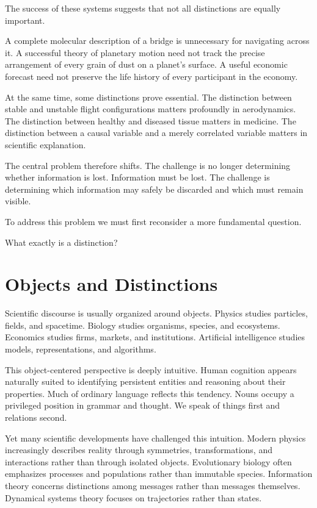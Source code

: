 \documentclass[11pt,oneside,openany]{book}
\begin{document}
The success of these systems suggests that not all distinctions are equally important.

A complete molecular description of a bridge is unnecessary for navigating across it. A successful theory of planetary motion need not track the precise arrangement of every grain of dust on a planet's surface. A useful economic forecast need not preserve the life history of every participant in the economy.

At the same time, some distinctions prove essential. The distinction between stable and unstable flight configurations matters profoundly in aerodynamics. The distinction between healthy and diseased tissue matters in medicine. The distinction between a causal variable and a merely correlated variable matters in scientific explanation.

The central problem therefore shifts. The challenge is no longer determining whether information is lost. Information must be lost. The challenge is determining which information may safely be discarded and which must remain visible.

To address this problem we must first reconsider a more fundamental question.

What exactly is a distinction?

\section{Objects and Distinctions}

Scientific discourse is usually organized around objects. Physics studies particles, fields, and spacetime. Biology studies organisms, species, and ecosystems. Economics studies firms, markets, and institutions. Artificial intelligence studies models, representations, and algorithms.

This object-centered perspective is deeply intuitive. Human cognition appears naturally suited to identifying persistent entities and reasoning about their properties. Much of ordinary language reflects this tendency. Nouns occupy a privileged position in grammar and thought. We speak of things first and relations second.

Yet many scientific developments have challenged this intuition. Modern physics increasingly describes reality through symmetries, transformations, and interactions rather than through isolated objects. Evolutionary biology often emphasizes processes and populations rather than immutable species. Information theory concerns distinctions among messages rather than messages themselves. Dynamical systems theory focuses on trajectories rather than states.
\end{document}
